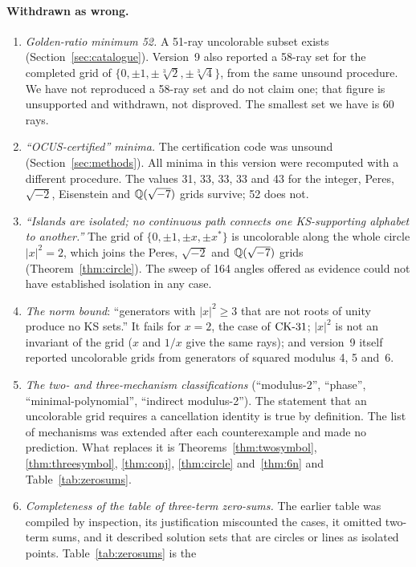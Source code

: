 \paragraph{Withdrawn as wrong.}
\begin{enumerate}[label=C\arabic*.,leftmargin=2.6em]
\item \emph{Golden-ratio minimum 52.}  A 51-ray uncolorable subset exists
(Section~\ref{sec:catalogue}).  Version~9 also reported a 58-ray set for the completed grid of
$\{0,\pm1,\pm\sqrt[3]2,\pm\sqrt[3]4\}$, from the same unsound procedure.  We have not reproduced
a 58-ray set and do not claim one; that figure is unsupported and withdrawn, not disproved.  The
smallest set we have is 60 rays.
\item \emph{``OCUS-certified'' minima.}  The certification code was unsound
(Section~\ref{sec:methods}).  All minima in this version were recomputed with a different
procedure.  The values 31, 33, 33, 33 and 43 for the integer, Peres, $\sqrt{-2}$, Eisenstein and
$\mathbb{Q}(\sqrt{-7})$ grids survive; 52 does not.
\item \emph{``Islands are isolated; no continuous path connects one KS-supporting alphabet to
another.''}  The grid of $\{0,\pm1,\pm x,\pm x^{*}\}$ is uncolorable along the whole circle
$|x|^2=2$, which joins the Peres, $\sqrt{-2}$ and $\mathbb{Q}(\sqrt{-7})$ grids
(Theorem~\ref{thm:circle}).  The sweep of 164 angles offered as evidence could not have
established isolation in any case.
\item \emph{The norm bound}: ``generators with $|x|^2\ge3$ that are not roots of unity produce no
KS sets.''  It fails for $x=2$, the case of $\mathrm{CK}\text{-}31$; $|x|^2$ is not an invariant of the grid
($x$ and $1/x$ give the same rays); and version~9 itself reported uncolorable grids from
generators of squared modulus 4, 5 and~6.
\item \emph{The two- and three-mechanism classifications} (``modulus-2'', ``phase'',
``minimal-polynomial'', ``indirect modulus-2'').  The statement that an uncolorable grid requires
a cancellation identity is true by definition.  The list of mechanisms was extended after each
counterexample and made no prediction.  What replaces it is
Theorems~\ref{thm:twosymbol}, \ref{thm:threesymbol}, \ref{thm:conj}, \ref{thm:circle}
and~\ref{thm:6n} and Table~\ref{tab:zerosums}.
\item \emph{Completeness of the table of three-term zero-sums.}  The earlier table was compiled
by inspection, its justification miscounted the cases, it omitted two-term sums, and it described
solution sets that are circles or lines as isolated points.  Table~\ref{tab:zerosums} is the

\end{enumerate}
